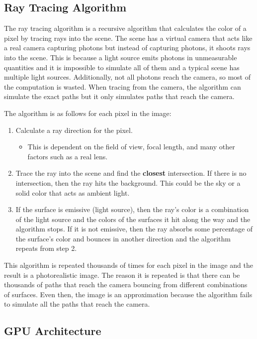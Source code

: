 \documentclass[12pt]{article}
\begin{document}
\subsection{Ray Tracing Algorithm}

The ray tracing algorithm is a recursive algorithm that calculates the color of a pixel by tracing rays into the scene.
The scene has a virtual camera that acts like a real camera capturing photons but instead of capturing photons, it shoots rays
into the scene.
This is because a light source emits photons in unmeasurable quantities and it is impossible to simulate all of them and a typical scene has multiple light sources.
Additionally, not all photons reach the camera, so most of the computation is wasted.
When tracing from the camera, the algorithm can simulate the exact paths but it only simulates paths that reach the camera.

The algorithm is as follows for each pixel in the image:
\begin{enumerate}
    \item Calculate a ray direction for the pixel.
    \begin{itemize}
        \item This is dependent on the field of view, focal length, and many other factors such as a real lens.
    \end{itemize}
    \item Trace the ray into the scene and find the {\bf closest} intersection. If there is no intersection, then the ray hits the background.
          This could be the sky or a solid color that acts as ambient light.
    \item If the surface is emissive (light source), then the ray's color is a combination of the light source and the colors of the surfaces it hit along the way and the algorithm stops.
          If it is not emissive, then the ray absorbs some percentage of the surface's color and bounces in another
          direction and the algorithm repeats from step 2.
\end{enumerate}

This algorithm is repeated thousands of times for each pixel in the image and the result is a photorealistic image.
The reason it is repeated is that there can be thousands of paths that reach the camera bouncing from different combinations of surfaces.
Even then, the image is an approximation because the algorithm fails to simulate all the paths that reach the camera.

\subsection{GPU Architecture}
\end{document}
